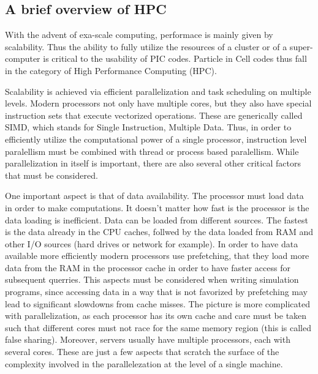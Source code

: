 \documentclass[12pt, class=report, crop=false]{standalone}
\begin{document}
\subsection{A brief overview of HPC}

With the advent of exa-scale computing, performace is mainly given by scalability.
Thus the ability to fully utilize the resources of a cluster or of a super-computer
is critical to the usability of PIC codes. Particle in Cell codes thus fall in
the category of High Performance Computing (HPC).

Scalability is achieved via efficient parallelization and task scheduling on multiple levels.
Modern processors not only have multiple cores, but they also have special instruction
sets that execute vectorized operations. These are generically called SIMD, which
stands for Single Instruction, Multiple Data. Thus, in order to efficiently utilize
the computational power of a single processor, instruction level paralellism must
be combined with thread or process based paralellism. While parallelization in
itself is important, there are also several other critical factors that must be
considered.

One important aspect is that of data availability. The processor must load data
in order to make computations. It doesn't matter how fast is the processor is the
data loading is inefficient. Data can be loaded from different sources. The
fastest is the data already in the CPU caches, follwed by the data loaded from RAM
and other I/O sources (hard drives or network for example). In order to have data
available more efficiently modern processors use prefetching, that they load more
data from the RAM in the processor cache in order to have faster access for subsequent
querries. This aspects must be considered when writing simulation programs, since
accessing data in a way that is not favorized by prefetching may lead to significant
slowdowns from cache misses. The picture is more complicated with parallelization,
as each processor has its own cache and care must be taken such that different
cores must not race for the same memory region (this is called false sharing).
Moreover, servers usually have multiple processors, each with several cores.
These are just a few aspects that scratch the surface of the complexity involved
in the parallelezation at the level of a single machine.
\end{document}
